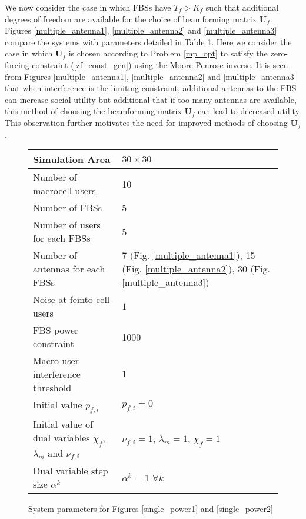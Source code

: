 We now consider the case in which FBSs have $T_f > K_f$ such that additional degrees of freedom are available for the choice of beamforming matrix $\mathbf{U}_f$. Figures \ref{multiple_antenna1}, \ref{multiple_antenna2} and \ref{multiple_antenna3} compare the systems with parameters detailed in Table \ref{table2}.
Here we consider the case in which $\mathbf{U}_f$ is chosen according to Problem \ref{mp_opt} to satisfy the zero-forcing constraint (\ref{zf_const_gen}) using the Moore-Penrose inverse. It is seen from Figures \ref{multiple_antenna1}, \ref{multiple_antenna2} and \ref{multiple_antenna3} that when interference is the limiting constraint, additional antennas to the FBS can increase social utility but additional that if too many antennas are available, this method of choosing the beamforming matrix $\mathbf{U}_f$ can lead to decreased utility. This observation further motivates the need for improved methods of choosing $\mathbf{U}_f$.


\begin{center}
\begin{figure}
\begin{tabular}{ | m{8cm} | m{5cm} | } 
\hline
Simulation Area & $30 \times 30$\\ 
\hline
Number of macrocell users & 10\\ 
\hline
Number of FBSs & 5\\ 
\hline
Number of users for each FBSs & 5\\ 
\hline
Number of antennas for each FBSs & 7 (Fig. \ref{multiple_antenna1}), 15 (Fig. \ref{multiple_antenna2}), 30 (Fig. \ref{multiple_antenna3})\\ 
\hline
Noise at femto cell users & $1$\\ 
\hline
FBS power constraint & 1000 \\ 
\hline
Macro user interference threshold & $1$\\ 
\hline
Initial value $p_{f,i}$ & $p_{f,i} = 0$\\
\hline
Initial value of dual variables $\chi_{f}$, $\lambda_{m}$ and $\nu_{f,i}$ & $\nu_{f,i}=1$, $\lambda_{m}=1 $, $\chi_{f}=1$\\
\hline
Dual variable step size $\alpha^k$& $\alpha^k= 1$ $\forall k$\\
\hline
\end{tabular}
\caption{System parameters for Figures \ref{single_power1} and \ref{single_power2}}
\label{table2}
\end{figure}
\end{center}



